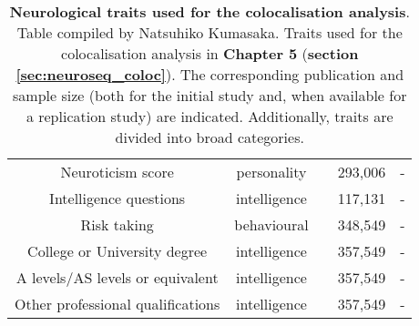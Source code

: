 \begin{table}[h]
\begin{tabular}{c c c c c}
    Neuroticism score & personality & \cite{neale2018gwas} & 293,006 & - \\
    Intelligence questions\footnotemark & intelligence & \cite{neale2018gwas} & 117,131 & -\\
    Risk taking & behavioural & \cite{neale2018gwas} & 348,549 & -\\
    College or University degree & intelligence & \cite{neale2018gwas} & 357,549 & - \\
    A levels/AS levels or equivalent & intelligence & \cite{neale2018gwas} & 357,549 & -\\
    Other professional qualifications  & intelligence & \cite{neale2018gwas} & 357,549 & -\\
    \end{tabular}
    \caption[Neurological traits used for the colocalisation analysis]{\textbf{Neurological traits used for the colocalisation analysis}.\\
    Table compiled by Natsuhiko Kumasaka.
    Traits used for the colocalisation analysis in \textbf{Chapter 5} (\textbf{section \ref{sec:neuroseq_coloc}}).
    The corresponding publication and sample size (both for the initial study and, when available for a replication study) are indicated.
    Additionally, traits are divided into broad categories.}
    \label{tab:coloc_neuro_traits}
\end{table}

